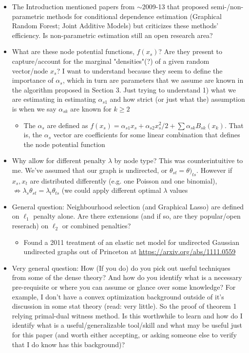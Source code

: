 \documentclass[11pt]{article}
\begin{document}
	\begin{itemize}
	
		\item The Introduction mentioned papers from \(\sim\)2009-13 that proposed semi-/non-parametric methods for conditional dependence estimation (Graphical Random Forest; Joint Additive Models) but criticizes these methods' efficiency. Is non-parametric estimation still an open research area?  
		
		\item What are these node potential functions, $f(x_s)$? Are they present to capture/account for the marginal "densities"(?) of a given random vector/node $x_s$? I want to understand because they seem to define the importance of $\alpha_s$, which in turn are parameters that we assume are known in the algorithm proposed in Section 3. Just trying to understand 1) what we are estimating in estimating $\alpha_{s1}$ and how strict (or just what the) assumption is when we say $\alpha_{sk}$ are known for $k\geq 2$
		\begin{itemize}
            \item The $\alpha_s$ are defined as $f(x_s) = \alpha_{s1}x_s + \alpha_{s2}x_s^2/2 + \sum \alpha_{sk}B_{sk}(x_k)$. That is, the $\alpha_s$ vector are coefficients for some linear combination that defines the node potential function 
        \end{itemize}

		\item Why allow for different penalty $\lambda$ by node type? This was counterintuitive to me. We've assumed that our graph is undirected, or $\theta_{st}=\theta)_{ts}$. However if $x_s, x_t$ are distributed differently (e.g. one Poisson and one binomial), $\not \Rightarrow \lambda_s \theta_{st}= \lambda_t \theta_{ts}$ (we could apply different optimal $\lambda$ values
		
		\item General question: Neighbourhood selection (and Graphical Lasso) are defined on $\ell_1$ penalty alone. Are there extensions (and if so, are they popular/open reserach) on $\ell_2$ or combined penalties?
			\begin{itemize}
                \item Found a 2011 treatment of an elastic net model for undirected Gaussian undirected graphs out of Princeton at \url{https://arxiv.org/abs/1111.0559}
            \end{itemize}
			
		\item Very general question: How (If you do) do you pick out useful techniques from some of the dense theory? And how do you identify what is a necessary pre-requisite or where you can assume or glance over some knowledge? For example, I don't have a convex optimization background outside of it's discussion in some stat theory (read: very little). So the proof of theorem 1 relying primal-dual witness method. Is this worthwhile to learn and how do I identify what is a useful/generalizable tool/skill and what may be useful just for this paper (and worth either accepting, or asking someone else to verify that I do know has this background)? 
	\end{itemize}
	
\end{document}
